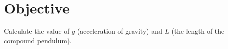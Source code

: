\documentclass{article}
\begin{document}

   \section*{Objective}
   
      Calculate the value of $g$ (acceleration of gravity) and $L$ (the length of the compound pendulum).
\end{document}
